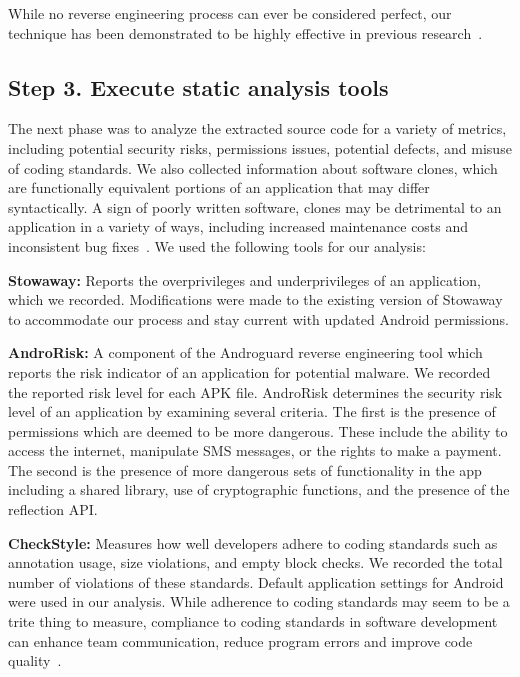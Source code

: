 \documentclass{sig-alternate}
\begin{document}
\vspace{-3 mm}

While no reverse engineering process can ever be considered perfect, our technique has been demonstrated to be highly effective in previous research~\cite{apvrille2012android,chawla2014transfiguring}.



\subsection{Step 3. Execute static analysis tools}
\label{sec: analysis}

The next phase was to analyze the extracted source code for a variety of metrics, including potential security risks, permissions issues, potential defects, and misuse of coding standards. We also collected information about software clones, which are functionally equivalent portions of an application that may differ syntactically. A sign of poorly written software, clones may be detrimental to an application in a variety of ways, including increased maintenance costs and inconsistent bug fixes~\cite{Roy:2009:CEC:1530898.1531101}. We used the following tools for our analysis:

 \textbf{Stowaway:} Reports the overprivileges and underprivileges of an application, which we recorded. Modifications were made to the existing version of Stowaway to accommodate our process and stay current with updated Android permissions. %

 \textbf{AndroRisk:} A component of the Androguard reverse engineering tool which reports the risk indicator of an application for potential malware. We recorded the reported risk level for each APK file. AndroRisk determines the security risk level of an application by examining several criteria. The first is the presence of permissions which are deemed to be more dangerous. These include the ability to access the internet, manipulate SMS messages, or the rights to make a payment. The second is the presence of more dangerous sets of functionality in the app including a shared library, use of cryptographic functions, and the presence of the reflection API.



 \textbf{CheckStyle:} Measures how well developers adhere to coding standards such as annotation usage, size violations, and empty block checks. We recorded the total number of violations of these standards. Default application settings for Android were used in our analysis. While adherence to coding standards may seem to be a trite thing to measure, compliance to coding standards in software development can enhance team communication, reduce program errors and improve code quality~\cite{Li:2005:ETC:1095714.1095770, li2006using}.
\end{document}
